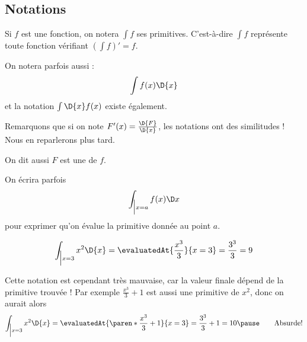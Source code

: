 \subsection{Notations}
\begin{frame}%
  Si \(f\) est une fonction, on notera \(\int f\) ses primitives.\pause{} C'est-à-dire \(\int f\) représente toute fonction vérifiant \((\int f)' = f\).\pause{}

  On notera parfois aussi :
  \begin{equation*}
    \int f(x)\D{x}
  \end{equation*}\pause{}
  et la notation \(\int \D{x} f(x)\) existe également.

  Remarquons que si on note \(F'(x) = \frac{\D{F}}{\D{x}}\), les notations ont des similitudes !\pause{} Nous en reparlerons plus tard.\pause{}

  On dit aussi \(F\) est une  de $f$.
\end{frame}
\begin{frame}
  \begin{remark}
    On écrira parfois
    \begin{equation*}
      \int_{\Big\vert{x = a}} f(x) \D x
    \end{equation*}
    pour exprimer qu'on évalue la primitive donnée au point \(a\).
  \end{remark}
\begin{example}\pause{}
  \begin{equation*}
    \int_{\Big\vert{x = 3}} x^{2} \D{x} = \evaluatedAt{\frac{x^{3}}{3}}{x=3} = \frac{3^{3}}{3} = 9
  \end{equation*}
\end{example}\pause{}
\begin{remark*}%
  Cette notation est cependant très mauvaise, car la valeur finale dépend de la primitive trouvée !\pause{} Par exemple \(\frac{x^{3}}{3} + 1\) est aussi une primitive de \(x^{2}\), donc on aurait alors
  \begin{equation*}
    \int_{\Big\vert{x = 3}} x^{2} \D{x} = \evaluatedAt{\paren*{\frac{x^{3}}{3} + 1}}{x=3} = \frac{3^{3}}{3} + 1 = 10\pause\qquad\text{Absurde!}
  \end{equation*}
\end{remark*}
\end{frame}


